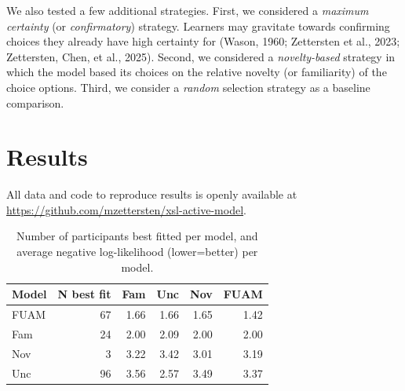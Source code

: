 \documentclass[10pt, letterpaper]{article}
\begin{document}
We also tested a few additional strategies. First, we considered a
\emph{maximum certainty} (or \emph{confirmatory}) strategy. Learners may
gravitate towards confirming choices they already have high certainty
for (Wason, 1960; Zettersten et al., 2023; Zettersten, Chen, et al.,
2025). Second, we considered a \emph{novelty-based} strategy in which
the model based its choices on the relative novelty (or familiarity) of
the choice options. Third, we consider a \emph{random} selection
strategy as a baseline comparison.

\section{Results}\label{results}

All data and code to reproduce results is openly available at
\url{https://github.com/mzettersten/xsl-active-model}.

\begin{table}[H]
\centering
\begin{tabular}{lrrrrr}
  \hline
Model & N best fit & Fam & Unc & Nov & FUAM \\ 
  \hline
FUAM &  67 & 1.66 & 1.66 & 1.65 & 1.42 \\ 
  Fam &  24 & 2.00 & 2.09 & 2.00 & 2.00 \\ 
  Nov &   3 & 3.22 & 3.42 & 3.01 & 3.19 \\ 
  Unc &  96 & 3.56 & 2.57 & 3.49 & 3.37 \\ 
   \hline
\end{tabular}
\caption{Number of participants best fitted per model, and average negative log-likelihood (lower=better) per model.} 
\end{table}
\end{document}
